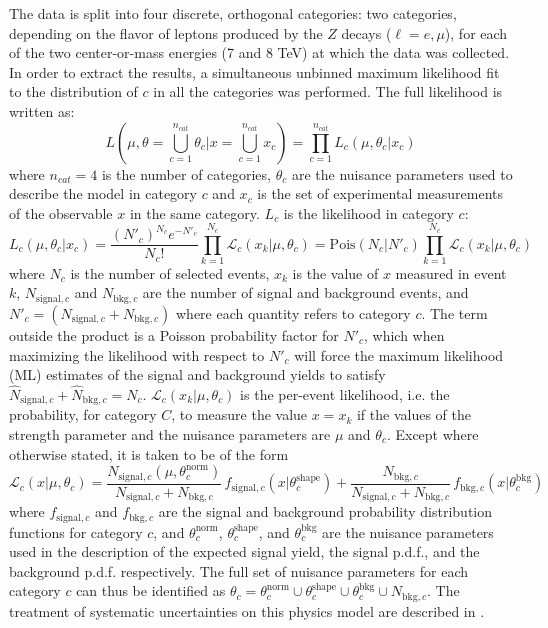 The data is split into four discrete, orthogonal categories: two categories,
depending on the flavor of leptons produced by the $Z$ decays ($\ell = e, \mu$),
for each of the two center-or-mass energies (7 and 8 TeV) at which the data was
collected. In order to extract the results, a simultaneous unbinned maximum
likelihood fit to the distribution of $c$ in all the categories was performed.
The full likelihood is written as:
\[
    L\left(\mu,\theta=\bigcup_{c=1}^{n_{cat}}\theta_c|x=\bigcup_{c=1}^{n_{cat}} 
    x_c\right) = 
    \prod_{c=1}^{n_{cat}} L_c(\mu,\theta_c|x_c)
\]
where $n_{cat}=4$ is the number of categories, $\theta_c$ are the nuisance
parameters used to describe the model in category $c$ and $x_c$ is the set of
experimental measurements of the observable $x$ in the same category. $L_c$
is the likelihood in category $c$:
\[
    L_c(\mu,\theta_c|x_c) = \frac{({N'}_c)^{N_c} e^{-{N'}_c}}{N_c !} \prod_{k=1}^{N_c}
    \mathcal{L}_c(x_k|\mu,\theta_c) = 
    \text{Pois}(N_c|{N'}_c) \prod_{k=1}^{N_c} \mathcal{L}_c(x_k|\mu,\theta_c) 
\]
where $N_c$ is the number of selected events, $x_k$ is the value of $x$ measured
in event $k$, $N_{\text{signal},c}$ and $N_{\text{bkg},c}$ are the number of
signal and background events, and ${N'}_c = (N_{\text{signal},c} + N_{\text{bkg},c})$
where each quantity refers to category $c$. The term outside the product is a
Poisson probability factor for ${N'}_c$, which when maximizing the likelihood with
respect to ${N'}_c$ will force the maximum likelihood (ML) estimates of the signal
and background yields to satisfy $\hat N_{\text{signal},c} + \hat N_{\text{bkg},c} =
N_c$. $\mathcal{L}_c(x_k|\mu,\theta_c)$ is the per-event likelihood, i.e. the 
probability, for category $C$, to measure the value $x=x_k$ if the values
of the strength parameter and the nuisance parameters are $\mu$ and $\theta_c$.
Except where otherwise stated, it is taken to be of the form
\[
    \mathcal{L}_c(x|\mu,\theta_c) = \frac{N_{\text{signal},c}(\mu,\theta_c^{\text{norm}})}{N_{\text{signal},c} + N_{\text{bkg},c}}\, f_{\text{signal},c}(x|\theta_c^{\text{shape}}) 
    + \frac{N_{\text{bkg},c}}{N_{\text{signal},c} + N_{\text{bkg},c}}\, f_{\text{bkg},c}(x|\theta_c^{\text{bkg}})
\]
where $f_{\text{signal},c}$ and $f_{\text{bkg},c}$ are the signal and background
probability distribution functions for category $c$, and $\theta_c^{\text{norm}}$,
$\theta_c^{\text{shape}}$, and $\theta_c^{\text{bkg}}$ are the nuisance parameters
used in the description of the expected signal yield, the signal p.d.f., and the
background p.d.f. respectively. The full set of nuisance parameters for each category
$c$ can thus be identified as 
$\theta_c = \theta_c^{\text{norm}} \cup \theta_c^{\text{shape}} \cup 
\theta_c^{\text{bkg}} \cup N_{\text{bkg},c}$. The treatment of systematic 
uncertainties on this physics model are described in .


